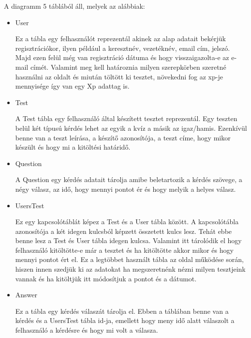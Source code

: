 A diagramm  5 táblából áll, melyek az alábbiak:
\begin{itemize}
    \item {User}
          \begin{addmargin}[\parindent]{0pt}
              Ez a tábla egy felhasználót reprezentál akinek az alap adatait bekérjük regisztrációkor, ilyen például a keresztnév, vezetéknév, email cím, jelszó. Majd ezen felül még van regisztráció dátuma és hogy visszaigazolta-e az e-mail címét. Valamint meg kell határoznia milyen szerepkörben szeretné használni az oldalt és miután töltött ki tesztet, növekedni fog az xp-je mennyisége így van egy Xp adattag is.
          \end{addmargin}

    \item {Test}
          \begin{addmargin}[\parindent]{0pt}
              A Test tábla egy felhasználó által készített tesztet reprezentál. Egy teszten belül két típusú kérdés lehet az egyik a kvíz a másik az igaz/hamis. Ezenkívül benne van a teszt leírása, a készítő azonosítója, a teszt címe, hogy mikor készült és hogy mi a kitöltési határidő.
          \end{addmargin}

    \item {Question}
          \begin{addmargin}[\parindent]{0pt}
              A Question egy kérdés adatait tárolja amibe beletartozik a kérdés szövege, a négy válasz, az idő, hogy mennyi pontot ér és hogy melyik a helyes válasz.
          \end{addmargin}


    \item {UsersTest}
          \begin{addmargin}[\parindent]{0pt}
              Ez egy kapcsolótáblát képez a Test és a User tábla között. A kapcsolótábla azonosítója a két idegen kulcsból képzett összetett kulcs lesz. Tehát ebbe benne lesz a Test és User tábla idegen kulcsa. Valamint itt tárolódik el hogy felhasználó kitöltötte-e már a tesztet és ha kitöltötte akkor mikor és hogy mennyi pontot ért el. Ez a legtöbbet használt tábla az oldal működése során, hiszen innen szedjük ki az adatokat ha megszeretnénk nézni milyen tesztjeink vannak és ha kitöltjük itt módosítjuk a pontot és a dátumot.
          \end{addmargin}

    \item {Answer}
          \begin{addmargin}[\parindent]{0pt}
              Ez a tábla egy kérdés válaszát tárolja el. Ebben a táblában benne van a kérdés és a UsersTest tábla id-ja, emellett hogy meny idő alatt válaszolt a felhasználó a kérdésre és hogy mi volt a válasza.
          \end{addmargin}

\end{itemize}

